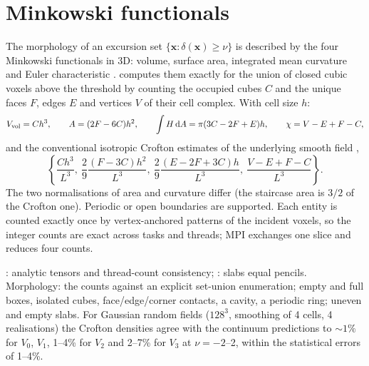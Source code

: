 \section{Minkowski functionals}\label{sec:web-minkowski}

The morphology of an excursion set $\{\bm x:\delta(\bm x)\ge\nu\}$ is described by the four Minkowski functionals in 3D: volume, surface area,
integrated mean curvature and Euler characteristic \cite{SchmalzingBuchert1997}.  computes them exactly for the union of
closed cubic voxels above the threshold by counting the occupied cubes $C$ and the unique faces $F$, edges $E$ and vertices $V$ of their cell
complex. With cell size $h$:
\begin{gather}
V_{\rm vol}=Ch^3,\qquad A=(2F-6C)h^2,\qquad\int H\,\mathrm{d} A=\pi(3C-2F+E)h,\qquad\chi=V-E+F-C,
\end{gather}
and the conventional isotropic Crofton estimates of the underlying smooth field \cite{Schmalzing1999},
\begin{equation}
\left\{\frac{Ch^3}{L^3},\ \frac29\frac{(F-3C)h^2}{L^3},\ \frac29\frac{(E-2F+3C)h}{L^3},\ \frac{V-E+F-C}{L^3}\right\}.
\end{equation}
The two normalisations of area and curvature differ (the staircase area is $3/2$ of the Crofton one). Periodic or open boundaries are supported.
Each entity is counted exactly once by vertex-anchored patterns of the incident voxels, so the integer counts are exact across tasks and threads;
MPI exchanges one slice and reduces four counts.

\begin{validation}
: analytic tensors and thread-count consistency; : slabs equal pencils.
Morphology: the counts against an explicit set-union enumeration; empty and full boxes, isolated cubes, face/edge/corner contacts, a cavity, a
periodic ring; uneven and empty slabs. For Gaussian random fields ($128^3$, smoothing of 4 cells, 4 realisations) the Crofton densities agree with
the continuum predictions \cite{SchmalzingBuchert1997} to $\sim1\%$ for $V_0$, $V_1$, 1--4\% for $V_2$ and 2--7\% for $V_3$ at $\nu=-2$--2, within
the statistical errors of 1--4\%.
\end{validation}
